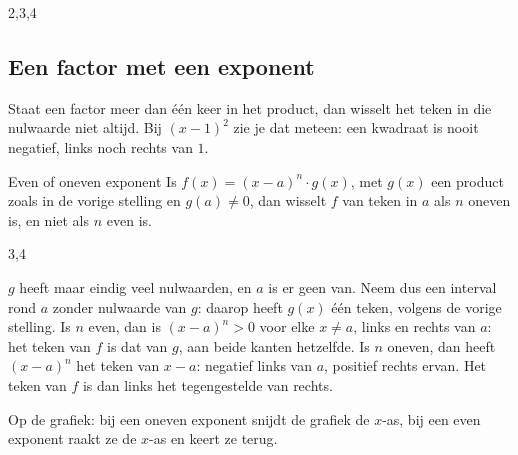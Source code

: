 \begin{alleenvoor}{2,3,4}
\subsection{Een factor met een exponent}

Staat een factor meer dan één keer in het product, dan wisselt het teken in die nulwaarde niet altijd. Bij $(x - 1)^2$ zie je dat meteen: een kwadraat is nooit negatief, links noch rechts van $1$.

\begin{theorie}
\begin{stelling}{Even of oneven exponent}
Is $f(x) = (x - a)^n \cdot g(x)$, met $g(x)$ een product zoals in de vorige stelling en $g(a) \neq 0$, dan wisselt $f$ van teken in $a$ als $n$ oneven is, en niet als $n$ even is.
\end{stelling}

\begin{alleenvoor}{3,4}
\begin{bewijs}
$g$ heeft maar eindig veel nulwaarden, en $a$ is er geen van. Neem dus een interval rond $a$ zonder nulwaarde van $g$: daarop heeft $g(x)$ één teken, volgens de vorige stelling. Is $n$ even, dan is $(x - a)^n > 0$ voor elke $x \neq a$, links en rechts van $a$: het teken van $f$ is dat van $g$, aan beide kanten hetzelfde. Is $n$ oneven, dan heeft $(x - a)^n$ het teken van $x - a$: negatief links van $a$, positief rechts ervan. Het teken van $f$ is dan links het tegengestelde van rechts.
\end{bewijs}
\end{alleenvoor}
\end{theorie}

Op de grafiek: bij een oneven exponent snijdt de grafiek de $x$-as, bij een even exponent raakt ze de $x$-as en keert ze terug.



\end{alleenvoor}
